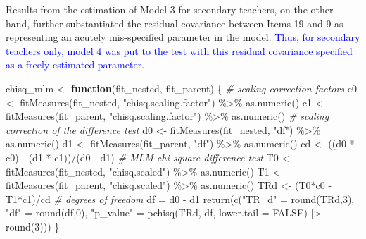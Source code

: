 \documentclass[
]{article}
\newenvironment{Shaded}{\begin{snugshade}}{\end{snugshade}}
\newcommand{\AttributeTok}[1]{\textcolor[rgb]{0.77,0.63,0.00}{#1}}
\newcommand{\CommentTok}[1]{\textcolor[rgb]{0.56,0.35,0.01}{\textit{#1}}}
\newcommand{\ConstantTok}[1]{\textcolor[rgb]{0.00,0.00,0.00}{#1}}
\newcommand{\ControlFlowTok}[1]{\textcolor[rgb]{0.13,0.29,0.53}{\textbf{#1}}}
\newcommand{\DecValTok}[1]{\textcolor[rgb]{0.00,0.00,0.81}{#1}}
\newcommand{\FunctionTok}[1]{\textcolor[rgb]{0.00,0.00,0.00}{#1}}
\newcommand{\NormalTok}[1]{#1}
\newcommand{\OtherTok}[1]{\textcolor[rgb]{0.56,0.35,0.01}{#1}}
\newcommand{\SpecialCharTok}[1]{\textcolor[rgb]{0.00,0.00,0.00}{#1}}
\newcommand{\StringTok}[1]{\textcolor[rgb]{0.31,0.60,0.02}{#1}}
\begin{document}
Results from the estimation of Model 3 for secondary teachers, on the other hand, further substantiated the residual covariance between Items 19 and 9 as representing an acutely mis-specified parameter in the model. \textcolor{blue}{Thus, for secondary teachers only, model 4 was put to the test with this residual covariance specified as a freely estimated parameter.}

\begin{Shaded}
\begin{Highlighting}[]
\NormalTok{chisq\_mlm }\OtherTok{\textless{}{-}} \ControlFlowTok{function}\NormalTok{(fit\_nested, fit\_parent) \{}
    \CommentTok{\# scaling correction factors}
\NormalTok{      c0 }\OtherTok{\textless{}{-}} \FunctionTok{fitMeasures}\NormalTok{(fit\_nested, }\StringTok{"chisq.scaling.factor"}\NormalTok{) }\SpecialCharTok{\%\textgreater{}\%} \FunctionTok{as.numeric}\NormalTok{()}
\NormalTok{      c1 }\OtherTok{\textless{}{-}} \FunctionTok{fitMeasures}\NormalTok{(fit\_parent, }\StringTok{"chisq.scaling.factor"}\NormalTok{) }\SpecialCharTok{\%\textgreater{}\%} \FunctionTok{as.numeric}\NormalTok{()}
    \CommentTok{\# scaling correction of the difference test}
\NormalTok{      d0 }\OtherTok{\textless{}{-}} \FunctionTok{fitMeasures}\NormalTok{(fit\_nested, }\StringTok{"df"}\NormalTok{) }\SpecialCharTok{\%\textgreater{}\%} \FunctionTok{as.numeric}\NormalTok{()}
\NormalTok{      d1 }\OtherTok{\textless{}{-}} \FunctionTok{fitMeasures}\NormalTok{(fit\_parent, }\StringTok{"df"}\NormalTok{) }\SpecialCharTok{\%\textgreater{}\%} \FunctionTok{as.numeric}\NormalTok{()}
\NormalTok{      cd }\OtherTok{\textless{}{-}}\NormalTok{ ((d0 }\SpecialCharTok{*}\NormalTok{ c0) }\SpecialCharTok{{-}}\NormalTok{ (d1 }\SpecialCharTok{*}\NormalTok{ c1))}\SpecialCharTok{/}\NormalTok{(d0 }\SpecialCharTok{{-}}\NormalTok{ d1)}
    \CommentTok{\# MLM chi{-}square difference test}
\NormalTok{      T0 }\OtherTok{\textless{}{-}} \FunctionTok{fitMeasures}\NormalTok{(fit\_nested, }\StringTok{"chisq.scaled"}\NormalTok{) }\SpecialCharTok{\%\textgreater{}\%} \FunctionTok{as.numeric}\NormalTok{()}
\NormalTok{      T1 }\OtherTok{\textless{}{-}} \FunctionTok{fitMeasures}\NormalTok{(fit\_parent, }\StringTok{"chisq.scaled"}\NormalTok{) }\SpecialCharTok{\%\textgreater{}\%} \FunctionTok{as.numeric}\NormalTok{()}
\NormalTok{      TRd }\OtherTok{\textless{}{-}}\NormalTok{ (T0}\SpecialCharTok{*}\NormalTok{c0 }\SpecialCharTok{{-}}\NormalTok{ T1}\SpecialCharTok{*}\NormalTok{c1)}\SpecialCharTok{/}\NormalTok{cd}
    \CommentTok{\# degrees of freedom}
\NormalTok{      df }\OtherTok{=}\NormalTok{ d0 }\SpecialCharTok{{-}}\NormalTok{ d1}
    \FunctionTok{return}\NormalTok{(}\FunctionTok{c}\NormalTok{(}\StringTok{"TR\_d"} \OtherTok{=} \FunctionTok{round}\NormalTok{(TRd,}\DecValTok{3}\NormalTok{), }
             \StringTok{"df"} \OtherTok{=} \FunctionTok{round}\NormalTok{(df,}\DecValTok{0}\NormalTok{), }
             \StringTok{"p\_value"} \OtherTok{=} \FunctionTok{pchisq}\NormalTok{(TRd, df, }\AttributeTok{lower.tail =} \ConstantTok{FALSE}\NormalTok{) }\SpecialCharTok{|\textgreater{}} \FunctionTok{round}\NormalTok{(}\DecValTok{3}\NormalTok{)))}
\NormalTok{\}}
\end{Highlighting}
\end{Shaded}
\end{document}
